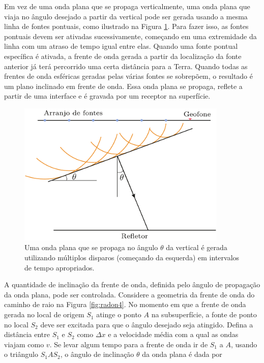 Em vez de uma onda plana que se propaga verticalmente, uma onda plana que viaja no ângulo desejado a partir da vertical pode ser gerada usando a mesma linha de fontes pontuais, como ilustrado na Figura \ref{fig:radon3}. Para fazer isso, as fontes pontuais devem ser ativadas sucessivamente, começando em uma extremidade da linha com um atraso de tempo igual entre elas. Quando uma fonte pontual específica é ativada, a frente de onda gerada a partir da localização da fonte anterior já terá percorrido uma certa distância para a Terra. Quando todas as frentes de onda esféricas geradas pelas várias fontes se sobrepõem, o resultado é um plano inclinado em frente de onda. Essa onda plana se propaga, reflete a partir de uma interface e é gravada por um receptor na superfície.

\begin{figure}[H]
\centering
\includegraphics[width=10cm]{figuras/cap2/radon3.pdf}
\caption{Uma onda plana que se propaga no ângulo $\theta$ da vertical é gerada utilizando múltiplos disparos (começando da esquerda) em intervalos de tempo apropriados.}
\label{fig:radon3}
\end{figure}

A quantidade de inclinação da frente de onda, definida pelo ângulo de propagação da onda plana, pode ser controlada. Considere a geometria da frente de onda do caminho de raio na Figura \ref{fig:radon4}. No momento em que a frente de onda gerada no local de origem $S_1$ atinge o ponto $A$ na subsuperfície, a fonte de ponto no local $S_2$ deve ser excitada para que o ângulo desejado seja atingido. Defina a distância entre $S_1$ e $S_2$ como $\Delta x$ e a velocidade média com a qual as ondas viajam como $v$. Se levar algum tempo para a frente de onda ir de $S_1$ a $A$, usando o triângulo $S_1 A S_2$, o ângulo de inclinação $\theta$ da onda plana é dada por

